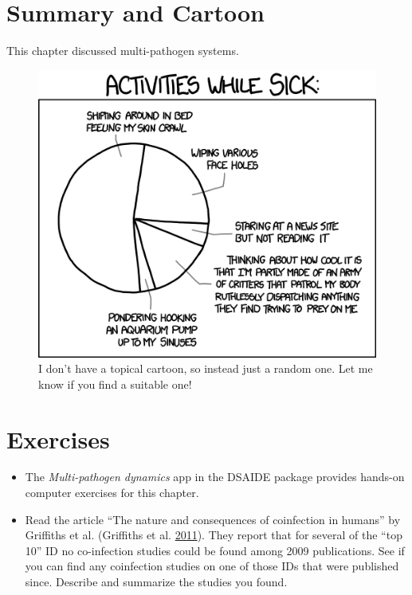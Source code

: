 \documentclass[]{book}
\providecommand{\tightlist}{%
  \setlength{\itemsep}{0pt}\setlength{\parskip}{0pt}}
\theoremstyle{definition}
\theoremstyle{definition}
\theoremstyle{definition}
\theoremstyle{remark}
\begin{document}
\section{Summary and Cartoon}\label{summary-and-cartoon-10}

This chapter discussed multi-pathogen systems.

\begin{figure}
\centering
\includegraphics{./images/xkcd-sick_day.png}
\caption{I don't have a topical cartoon, so instead just a random one.
Let me know if you find a suitable one!}
\end{figure}

\section{Exercises}\label{exercises-10}

\begin{itemize}
\tightlist
\item
  The \emph{Multi-pathogen dynamics} app in the DSAIDE package provides
  hands-on computer exercises for this chapter.
\item
  Read the article ``The nature and consequences of coinfection in
  humans'' by Griffiths et al. (Griffiths et al.
  \protect\hyperlink{ref-griffiths11}{2011}). They report that for
  several of the ``top 10'' ID no co-infection studies could be found
  among 2009 publications. See if you can find any coinfection studies
  on one of those IDs that were published since. Describe and summarize
  the studies you found.
\end{itemize}
\end{document}
